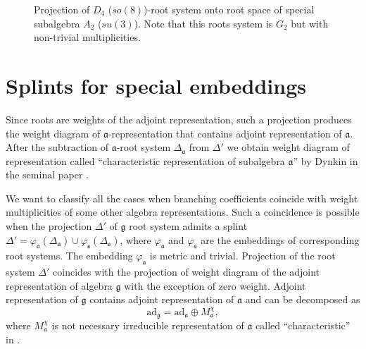 \documentclass{article}
\newcommand{\gf}{\mathfrak{g}}
\newcommand{\af}{\mathfrak{a}}
\newcommand{\sfr}{\mathfrak{s}}
\begin{document}
\begin{figure}[h!bt]
  \noindent{}
  \caption{Projection of $D_{4}$ ($so(8)$)-root system onto root space of special subalgebra $A_{2}$
    ($su(3)$). Note that this roots system is $G_{2}$ but with non-trivial multiplicities. }
 \label{fig:d4-a2_splint}
\end{figure}



\section{Splints for special embeddings}
\label{sec:splints-spec-embedd}

Since roots are weights of the adjoint representation, such a projection produces the weight diagram
of $\af$-representation that contains adjoint representation of $\af$. After the subtraction of
$\af$-root system $\Delta_{\af}$ from $\Delta'$ we obtain weight diagram of representation called
``characteristic representation of subalgebra $\af$'' by Dynkin in the seminal paper
\cite{dynkin1952semisimple}.

We want to classify all the cases when branching coefficients coincide with weight multiplicities of
some other algebra representations. Such a coincidence is possible when the projection $\Delta'$ of
$\gf$ root system admits a splint $\Delta'=\varphi_{\af}(\Delta_{\af})\cup
\varphi_{\sfr}(\Delta_{\sfr})$, where $\varphi_{\af}$ and $\varphi_{\sfr}$ are the embeddings of
corresponding root systems. The embedding $\varphi_{\af}$ is metric and trivial. Projection of the
root system $\Delta'$ coincides with the projection of weight diagram of the adjoint representation
of algebra $\gf$ with the exception of zero weight. Adjoint representation of $\gf$ contains adjoint
representation of $\af$ and can be decomposed as
\begin{equation}
  \label{eq:3}
  \mathrm{ad}_{\gf}=\mathrm{ad}_{\af}\oplus M_{\af}^{\chi},
\end{equation}
where $M^{\chi}_{\af}$ is not necessary irreducible representation of $\af$ called
``characteristic'' in \cite{dynkin1952semisimple}. 
\end{document}
